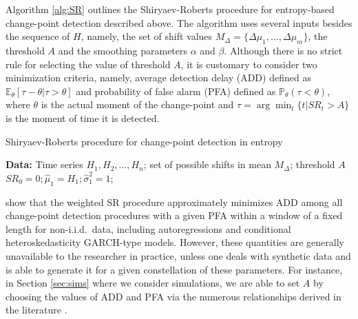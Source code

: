 Algorithm \ref{alg:SR} outlines the Shiryaev-Roberts procedure for entropy-based change-point detection described above. The algorithm uses several inputs besides the sequence of $H$, namely, the set of shift values $M_{\Delta}=\{\Delta\mu_1, \ldots, \Delta\mu_m\}$, the threshold $A$ and the smoothing parameters $\alpha$ and $\beta$.  Although there is no strict rule for selecting the value of threshold $A$, it is customary to consider two minimization criteria, namely, average detection delay (ADD) defined as $   \mathbb{E}_{\theta}[\tau-\theta|\tau>\theta]$ and probability of false alarm (PFA) defined as $ \mathbb{P}_{\theta}( \tau < \theta)$, where $\theta$ is the actual moment of the change-point and $\tau = \arg\min_{t} \{t|SR_t > A\}$  is the moment of time it is detected. 

    \begin{algorithm}[H]
    \caption{Shiryaev-Roberts procedure for change-point detection in entropy}\label{alg:SR}
    
    \textbf{Data:} Time series $H_1, H_2, ..., H_n$; set of possible shifts in mean $M_\Delta$; threshold $A$\\
    $SR_0 = 0; \hat{\mu}_1 = H_1; \hat{\sigma}_1^2 = 1$;
    

    \end{algorithm} 

\vspace{1cm}



\cite{Pergamenchtchikov/tartakovsky:18, Pergamenchtchikov/tartakovsky:19} show that the weighted SR procedure approximately minimizes ADD  among all change-point detection procedures with a given PFA within a window of a fixed length for non-i.i.d.~data, including autoregressions and conditional heteroskedasticity GARCH-type models. However, these quantities are generally unavailable to the researcher in practice, unless one deals with synthetic data and is able to generate it for a given constellation of these parameters. For instance, in Section \ref{sec:sims} where we consider simulations, we are able to set $A$ by choosing the values of ADD and PFA via the numerous relationships derived in the literature \cite[see, e.g.,][]{Tartakovsky_th}. 

